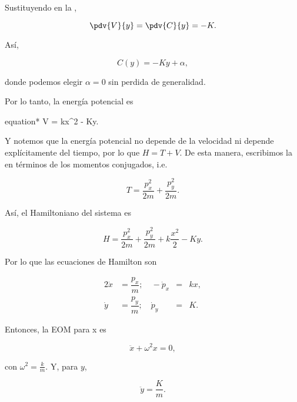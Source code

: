 \documentclass[../main.tex]{subfiles}
\begin{document}
\begin{problema}
	Sustituyendo en la ,

	\begin{equation*}
		\pdv{V}{y} = \pdv{C}{y} = - K.
	\end{equation*}

	Así,

	\begin{equation*}
		C(y) = -Ky + \alpha,
	\end{equation*}

	donde podemos elegir \(\alpha = 0\) sin perdida de generalidad.

	Por lo tanto, la energía potencial es

	\begin{empheq}[box = \mainresult]{equation*}
		V = kx^{2} - Ky.
	\end{empheq}

	Y notemos que la energía potencial no depende de la velocidad ni depende
	explícitamente del tiempo, por lo que \(H = T + V\). De esta manera,
	escribimos la  en términos de los momentos conjugados, i.e.

	\begin{equation*}
		T = \dfrac{p_{x}^{2}}{2m} + \dfrac{p_{y}^{2}}{2m}.
	\end{equation*}

	Así, el Hamiltoniano del sistema es

	\begin{equation*}
		H = \dfrac{p_{x}^{2}}{2m} + \dfrac{p_{y}^{2}}{2m} + k \dfrac{x^{2}}{2} - Ky.
	\end{equation*}

	Por lo que las ecuaciones de Hamilton son

	\begin{alignat*}{2}
		\dot{x} & = \dfrac{p_{x}}{m};\quad - \dot{p}_{x} & {}={} & kx, \\
		\dot{y} & = \dfrac{p_{y}}{m};\quad \dot{p}_{y}   & {}={} & K.
	\end{alignat*}

	Entonces, la EOM para x es

	\begin{equation*}
		\ddot{x} + \omega^{2}x = 0,
	\end{equation*}

	con \(\omega^{2} = \tfrac{k}{m}\). Y, para \(y\),

	\begin{equation}
		\ddot{y} = \dfrac{K}{m}.
	\end{equation}


\end{problema}
\end{document}
